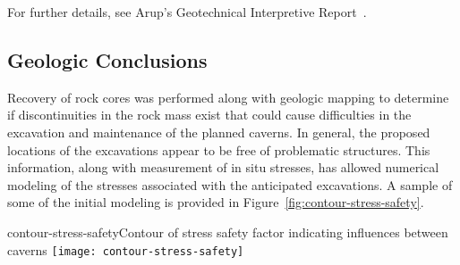 For further details, see Arup's Geotechnical Interpretive Report~\cite{arup-100-2011-3a}.

\subsection{Geologic Conclusions}
\label{sec:fscf-site-cond-geo-concl}

Recovery of rock cores was performed along with geologic mapping to determine if discontinuities in the rock mass exist that could cause difficulties in the %
excavation and maintenance of the planned caverns. In general, the proposed locations of the excavations %
appear to be free of problematic structures. This information, along with measurement of in situ stresses, has allowed numerical modeling of the stresses associated with the anticipated excavations. A sample of some of the initial modeling %
is provided in Figure~\ref{fig:contour-stress-safety}.

\begin{cdrfigure}{contour-stress-safety}{Contour of stress safety factor indicating influences between caverns}
\texttt{[image: contour-stress-safety]}
\end{cdrfigure}


